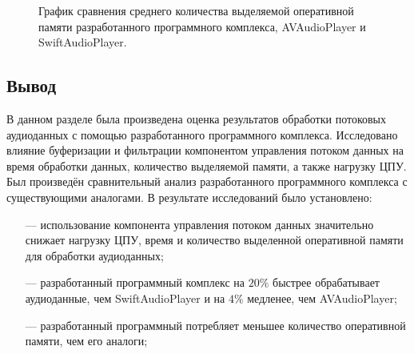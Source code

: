     \newpage

    \begin{figure}[!h]
        \caption{
            График сравнения среднего количества выделяемой оперативной памяти
            разработанного программного комплекса, AVAudioPlayer и SwiftAudioPlayer.
        }
        \label{fig:disp-ram}
    \end{figure}

\subsection*{Вывод}
    \par В данном разделе была произведена оценка результатов обработки потоковых аудиоданных с помощью разработанного программного комплекса.
    Исследовано влияние буферизации и фильтрации компонентом управления потоком данных на время обработки данных, количество выделяемой памяти, а также нагрузку ЦПУ.
    Был произведён сравнительный анализ разработанного программного комплекса с существующими аналогами.
    В результате исследований было установлено:
    \begin{itemize}
        \item[---] использование компонента управления потоком данных значительно снижает нагрузку ЦПУ, 
        время и количество выделенной оперативной памяти для обработки аудиоданных;
        \item[---] разработанный программный комплекс на $20\%$ быстрее обрабатывает аудиоданные, 
        чем SwiftAudioPlayer и на $4\%$ медленее, чем AVAudioPlayer;
        \item[---] разработанный программный потребляет меньшее количество оперативной памяти, чем его аналоги;
    \end{itemize}
\pagebreak